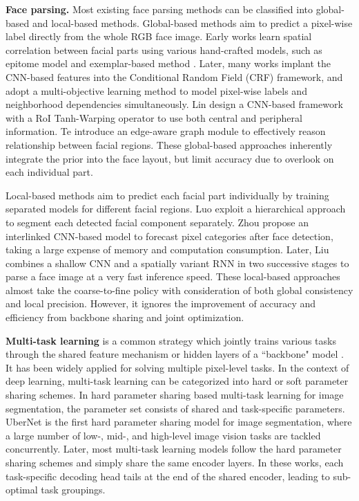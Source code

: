 \documentclass[10pt,twocolumn,letterpaper]{article}
\begin{document}
\noindent\textbf{Face parsing.} Most existing face parsing methods can be classified into global-based and local-based methods.
Global-based methods aim to predict a pixel-wise label directly from the whole RGB face image. Early works learn spatial correlation between facial parts using various hand-crafted models, such as epitome model \cite{Labelfaces} and exemplar-based method \cite{helen}. Later, many works \cite{multi_objective, cnn_cascade, Zhou2017FacePV, adaptive_field} implant the CNN-based features into the Conditional Random Field (CRF) framework, and adopt a multi-objective learning method to model pixel-wise labels and neighborhood dependencies simultaneously. Lin \etal \cite{roiTanh} design a CNN-based framework with a RoI Tanh-Warping operator to use both central and peripheral information. Te \etal \cite{te2020edge} introduce an edge-aware graph module to effectively reason relationship between facial regions. These global-based approaches inherently integrate the prior into the face layout, but limit accuracy due to overlook on each individual part.

Local-based methods aim to predict each facial part individually by training separated models for different facial regions. Luo \etal \cite{hierarchical_luo} exploit a hierarchical approach to segment each detected facial component separately. Zhou \etal \cite{icnn} propose an interlinked CNN-based model to forecast pixel categories after face detection, taking a large expense of memory and computation consumption. Later, Liu \etal \cite{lius} combines a shallow CNN and a spatially variant RNN in two successive stages to parse a face image at a very fast inference speed. These local-based approaches almost take the coarse-to-fine policy with consideration of both global consistency and local precision. However, it ignores the improvement of accuracy and efficiency from backbone sharing and joint optimization.

\noindent\textbf{Multi-task learning} is a common strategy which jointly trains various tasks through the shared feature mechanism or hidden layers of a ``backbone" model \cite{multi_task}. 
It has been widely applied for solving multiple pixel-level tasks. In the context of deep learning, multi-task learning can be categorized into hard or soft parameter sharing schemes.
In hard parameter sharing based multi-task learning for image segmentation, the parameter set consists of shared and task-specific parameters. UberNet \cite{ubernet} is the first hard parameter sharing model for image segmentation, where a large number of low-, mid-, and high-level image vision tasks are tackled concurrently. Later, most multi-task learning models \cite{Kendall_2018_CVPR, Neven2017FastSU, MultiNet} follow the hard parameter sharing schemes and simply share the same encoder layers. In these works, each task-specific decoding head tails at the end of the shared encoder, leading to sub-optimal task groupings.
\end{document}
